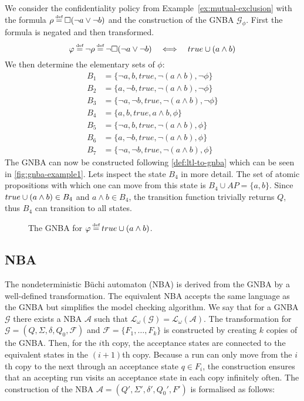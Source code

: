 \begin{example}
We consider the confidentiality policy from Example~\ref{ex:mutual-exclusion} with the formula $\conf \eqdef \G(\lnot a \lor \lnot b)$ and the construction of the GNBA $\mathcal{G}_\phi$. First the formula is negated and then transformed.
\begin{equation*}
    \phi \eqdef \lnot \conf \eqdef \lnot \G(\lnot a \lor \lnot b) \quad\Longleftrightarrow\quad true \U (a \land b)
\end{equation*}
We then determine the elementary sets of $\phi$:
\begin{align*}
    B_1 &= \{\lnot a, b, true, \lnot(a \land b), \lnot\phi\} \\
    B_2 &= \{a, \lnot b, true, \lnot(a \land b), \lnot\phi\} \\
    B_3 &= \{\lnot a, \lnot b, true, \lnot(a \land b), \lnot\phi\} \\
    B_4 &= \{a, b, true, a \land b, \phi\} \\
    B_5 &= \{\lnot a, b, true, \lnot(a \land b), \phi\} \\
    B_6 &= \{a, \lnot b, true, \lnot(a \land b), \phi\} \\
    B_7 &= \{\lnot a, \lnot b, true, \lnot(a \land b), \phi\}
\end{align*}
The GNBA can now be constructed following \autoref{def:ltl-to-gnba} which can be seen in \autoref{fig:gnba-example1}. Lets inspect the state $B_4$ in more detail. The set of atomic propositions with which one can move from this state is $B_4 \cup AP = \{a,b\}$. Since $true \cup (a \land b) \in B_4$ and $a \land b \in B_4$, the transition function trivially returns $Q$, thus $B_4$ can transition to all states.

\begin{figure}[!ht]
    \centering
    
    \caption{The GNBA for $\phi \eqdef true\U (a \land b)$.}
    \label{fig:gnba-example1}
\end{figure}
\end{example}

\subsection{NBA}\label{sec:nba}
The nondeterministic Büchi automaton (NBA) is derived from the GNBA by a well-defined transformation. The equivalent NBA accepts the same language as the GNBA but simplifies the model checking algorithm. We say that for a GNBA $\mathcal{G}$ there exists a NBA $\mathcal{A}$ such that $\mathcal{L}_\omega(\mathcal{G})=\mathcal{L}_\omega(\mathcal{A})$. The transformation for $\mathcal{G}=(Q,\Sigma,\delta,Q_0,\mathcal{F})$ and $\mathcal{F}=\{F_1,\ldots,F_k\}$ is constructed by creating $k$ copies of the GNBA. Then, for the $i$th copy, the acceptance states are connected to the equivalent states in the $(i+1)$th copy. Because a run can only move from the $i$th copy to the next through an acceptance state $q \in F_i$, the construction ensures that an accepting run visits an acceptance state in each copy infinitely often. The construction of the NBA $\mathcal{A}=(Q',\Sigma',\delta',Q_0',F')$ is formalised as follows:

